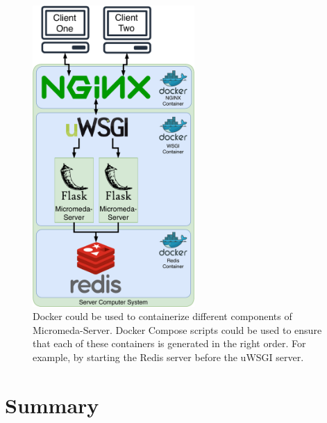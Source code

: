 \begin{figure}[!ht]
  \centering
	\includegraphics[width=0.55\textwidth]{media/micromeda-server-docker.pdf}
	 \caption{Docker could be used to containerize different components of Micromeda-Server. Docker Compose scripts could be used to ensure that each of these containers is generated in the right order. For example, by starting the Redis server before the uWSGI server.}
	 \label{fig:micromeda-docker}
\end{figure}

\section{Summary}

